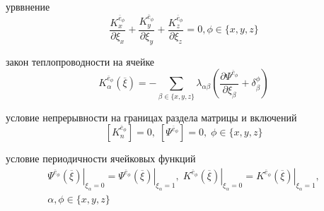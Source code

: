 урввнение
\begin{equation}
    \frac{K^{ \overline{e}_{\phi}}_x}{\partial \xi_x} +
    \frac{K^{ \overline{e}_{\phi}}_y}{\partial \xi_y} +
    \frac{K^{ \overline{e}_{\phi}}_z}{\partial \xi_z} = 0,
    \phi \in \{x,y,z\} 
\end{equation}

закон теплопроводности на ячейке
\begin{equation}
    K^{ \overline{e}_{\phi}}_{\alpha} \left( \overline{\xi} \right) =
    - \sum_{ \beta \in \{x,y,z\} } \lambda_{\alpha\beta}
    \left( \frac{\partial \Psi^{ \overline{e}_{\phi}}}{\partial \xi_{\beta}} + \delta^{\phi}_{\beta} \right) 
\end{equation}

условие непрерывности на границах раздела матрицы и включений
\begin{equation}
    \left[  K^{ \overline{e}_{\phi}}_n \right] = 0, \; \left[  \Psi^{ \overline{e}_{\phi}}\right] = 0
    , \; \phi \in \{x,y,z\}
\end{equation}

условие периодичности ячейковых функций
\begin{equation}
    \begin{gathered}
    \left. \Psi^{ \overline{e}_{\phi}} \left( \overline{\xi} \right) \right|_{\xi_{\alpha}=0} =
    \left. \Psi^{ \overline{e}_{\phi}} \left( \overline{\xi} \right) \right|_{\xi_{\alpha}=1}, \;
    \left. K^{ \overline{e}_{\phi}} \left( \overline{\xi} \right) \right|_{\xi_{\alpha}=0} =
    \left. K^{ \overline{e}_{\phi}} \left( \overline{\xi} \right) \right|_{\xi_{\alpha}=1},
    \\
    \alpha,\phi \in \{x,y,z\}
    \end{gathered}
\end{equation}

